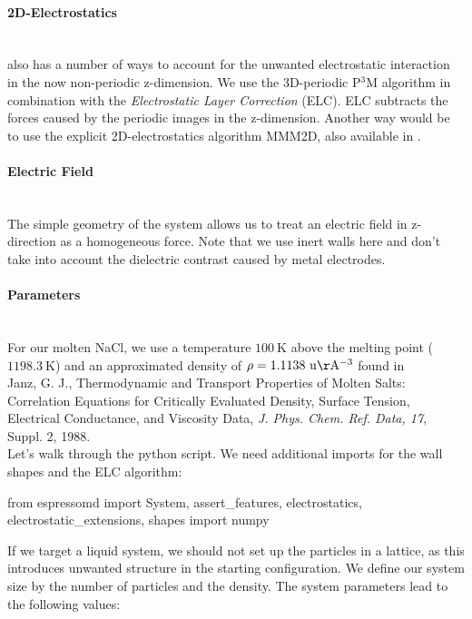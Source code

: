 \documentclass[
a4paper,                        %
11pt,                           %
twoside,                        %
footsepline,                    %
headsepline,                    %
headexclude,                    %
footexclude,                    %
pagesize,                       %
]{scrartcl}
\begin{document}
\paragraph{2D-Electrostatics}\mbox{}\\
\es also has a number of ways to account for the unwanted electrostatic interaction in the now non-periodic z-dimension.
We use the 3D-periodic P$^3$M algorithm in combination with the \emph{Electrostatic Layer Correction} (ELC). 
ELC subtracts the forces caused by the periodic images in the z-dimension. Another way would be to use the explicit 2D-electrostatics algorithm
MMM2D, also available in \es.
\paragraph{Electric Field}\mbox{}\\
The simple geometry of the system allows us to treat an electric field in z-direction as a homogeneous force.
Note that we use inert walls here and don't take into account the dielectric contrast caused by metal electrodes.
\paragraph{Parameters}\mbox{}\\
For our molten NaCl, we use a temperature $100 \ \mathrm{K}$ above the melting point ($1198.3 \ \mathrm{K}$) 
and an approximated density of $\rho = 1.1138 \ \mathrm{u \AA^{-3}}$ found in \\
Janz, G. J., Thermodynamic and Transport Properties of Molten Salts: Correlation Equations for Critically Evaluated Density, Surface Tension,
Electrical Conductance, and Viscosity Data, \emph{J. Phys. Chem. Ref. Data, 17}, Suppl. 2, 1988.\\

Let's walk through the python script. We need additional imports for the wall shapes and the ELC algorithm:

\begin{pypresso}
from espressomd import System, assert_features, electrostatics, electrostatic_extensions, shapes
import numpy
\end{pypresso}

If we target a liquid system, we should not set up the particles in a lattice, 
as this introduces unwanted structure in the starting configuration.
We define our system size by the number of particles and the density.
The system parameters lead to the following values:
\end{document}
